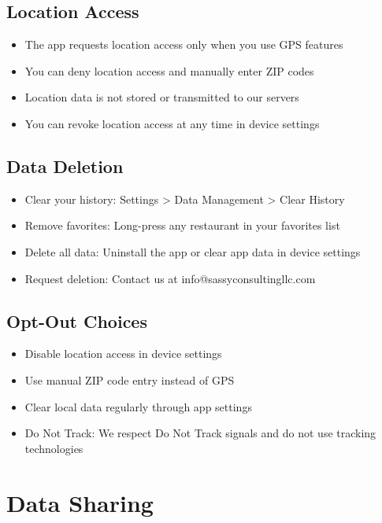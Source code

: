 \documentclass[11pt,letterpaper]{article}
\begin{document}
\subsection{Location Access}
\begin{itemize}
    \item The app requests location access only when you use GPS features
    \item You can deny location access and manually enter ZIP codes
    \item Location data is not stored or transmitted to our servers
    \item You can revoke location access at any time in device settings
\end{itemize}

\subsection{Data Deletion}
\begin{itemize}
    \item Clear your history: Settings > Data Management > Clear History
    \item Remove favorites: Long-press any restaurant in your favorites list
    \item Delete all data: Uninstall the app or clear app data in device settings
    \item Request deletion: Contact us at info@sassyconsultingllc.com
\end{itemize}

\subsection{Opt-Out Choices}
\begin{itemize}
    \item Disable location access in device settings
    \item Use manual ZIP code entry instead of GPS
    \item Clear local data regularly through app settings
    \item Do Not Track: We respect Do Not Track signals and do not use tracking technologies
\end{itemize}

\section{Data Sharing}
\end{document}
